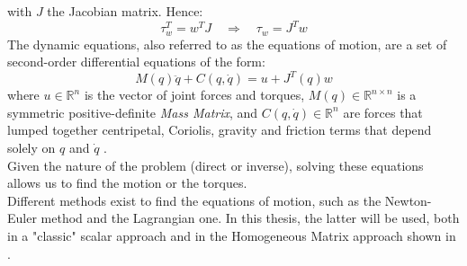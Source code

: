 \documentclass[a4paper,12pt,oneside]{report}
\begin{document}
with $J$ the Jacobian matrix. Hence:
\begin{equation}
  \tau_w^T=w^TJ \quad \Rightarrow \quad \tau_w=J^Tw
  \label{force_jacobian}
\end{equation}
The dynamic equations, also referred to as the equations of motion, are a set of second-order differential equations of the form:
\begin{equation}
  M(q)\ddot{q}+C(q,\dot{q})=u+J^T(q)w
  \label{equation_motion}
\end{equation}
where $u \in \mathbb{R}^n$ is the vector of joint forces and torques, $M(q) \in \mathbb{R}^{n \times n}$ is a symmetric positive-definite \textit{Mass Matrix}, and $C(q,\dot{q}) \in \mathbb{R}^n$ are forces that lumped together centripetal, Coriolis, gravity and friction terms that depend solely on $q$ and $\dot{q}$ \cite{eleven}.\\
Given the nature of the problem (direct or inverse), solving these equations allows us to find the motion or the torques.\\
Different methods exist to find the equations of motion, such as the Newton-Euler method and the Lagrangian one. In this thesis, the latter will be used, both in a "classic" scalar approach and in the Homogeneous Matrix approach shown in \cite{ten}.
\newpage
\end{document}
